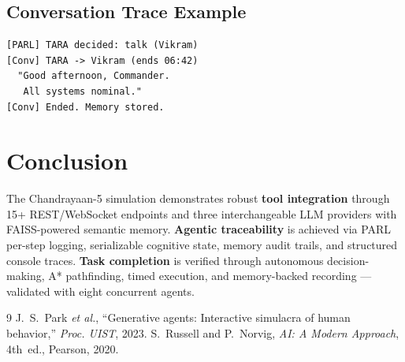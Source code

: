 \documentclass[conference]{IEEEtran}
\begin{document}
\subsection{Conversation Trace Example}

\begin{lstlisting}[language={}]
[PARL] TARA decided: talk (Vikram)
[Conv] TARA -> Vikram (ends 06:42)
  "Good afternoon, Commander.
   All systems nominal."
[Conv] Ended. Memory stored.
\end{lstlisting}

\section{Conclusion}

The Chandrayaan-5 simulation demonstrates robust \textbf{tool integration} through 15+ REST/WebSocket endpoints and three interchangeable LLM providers with FAISS-powered semantic memory. \textbf{Agentic traceability} is achieved via PARL per-step logging, serializable cognitive state, memory audit trails, and structured console traces. \textbf{Task completion} is verified through autonomous decision-making, A* pathfinding, timed execution, and memory-backed recording --- validated with eight concurrent agents.

\begin{thebibliography}{9}\itemsep=0pt\parskip=0pt
J.~S.~Park \textit{et al.}, ``Generative agents: Interactive simulacra of human behavior,'' \textit{Proc. UIST}, 2023.
S.~Russell and P.~Norvig, \textit{AI: A Modern Approach}, 4th~ed., Pearson, 2020.
\end{thebibliography}
\end{document}
